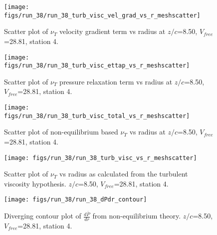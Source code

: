 \begin{figure}[H]
\centering
\texttt{[image: figs/run\_38/run\_38\_turb\_visc\_vel\_grad\_vs\_r\_meshscatter]}
\caption{Scatter plot of $\nu_T$ velocity gradient term vs radius at $z/c$=8.50, $V_{free}$=28.81, station 4.}
\end{figure}


\begin{figure}[H]
\centering
\texttt{[image: figs/run\_38/run\_38\_turb\_visc\_ettap\_vs\_r\_meshscatter]}
\caption{Scatter plot of $\nu_T$ pressure relaxation term vs radius at $z/c$=8.50, $V_{free}$=28.81, station 4.}
\end{figure}


\begin{figure}[H]
\centering
\texttt{[image: figs/run\_38/run\_38\_turb\_visc\_total\_vs\_r\_meshscatter]}
\caption{Scatter plot of non-equilibrium based $\nu_T$ vs radius at $z/c$=8.50, $V_{free}$=28.81, station 4.}
\end{figure}


\begin{figure}[H]
\centering
\texttt{[image: figs/run\_38/run\_38\_turb\_visc\_vs\_r\_meshscatter]}
\caption{Scatter plot of $\nu_T$ vs radius as calculated from the turbulent viscosity hypothesis. $z/c$=8.50, $V_{free}$=28.81, station 4.}
\end{figure}


\begin{figure}[H]
\centering
\texttt{[image: figs/run\_38/run\_38\_dPdr\_contour]}
\caption{Diverging contour plot of $\frac{d\bar{P}}{dr}$ from non-equilibrium theory. $z/c$=8.50, $V_{free}$=28.81, station 4.}
\end{figure}


